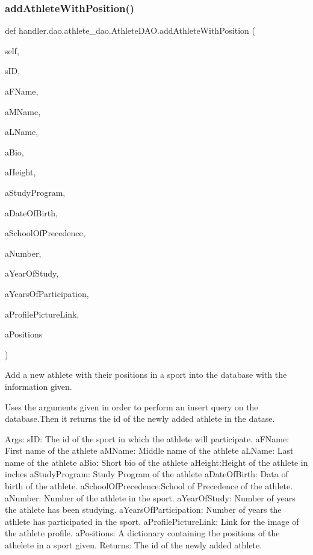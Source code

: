 \subsubsection{\texorpdfstring{add\+Athlete\+With\+Position()}{addAthleteWithPosition()}}
{\footnotesize\ttfamily def handler.\+dao.\+athlete\+\_\+dao.\+Athlete\+D\+A\+O.\+add\+Athlete\+With\+Position (\begin{DoxyParamCaption}\item[{}]{self,  }\item[{}]{s\+ID,  }\item[{}]{a\+F\+Name,  }\item[{}]{a\+M\+Name,  }\item[{}]{a\+L\+Name,  }\item[{}]{a\+Bio,  }\item[{}]{a\+Height,  }\item[{}]{a\+Study\+Program,  }\item[{}]{a\+Date\+Of\+Birth,  }\item[{}]{a\+School\+Of\+Precedence,  }\item[{}]{a\+Number,  }\item[{}]{a\+Year\+Of\+Study,  }\item[{}]{a\+Years\+Of\+Participation,  }\item[{}]{a\+Profile\+Picture\+Link,  }\item[{}]{a\+Positions }\end{DoxyParamCaption})}

\begin{DoxyVerb}Add a new athlete with their positions in a sport
into the database with the information given.

Uses the arguments given in order to perform an insert query on 
the database.Then it returns the id of the newly added athlete in
the datase.

Args:
    sID: The id of the sport in which the athlete will participate.
    aFName: First name of the athlete
    aMName: Middle name of the athlete
    aLName: Last name of the athlete
    aBio: Short bio of the athlete
    aHeight:Height of the athlete in inches
    aStudyProgram: Study Program of the athlete
    aDateOfBirth: Data of birth of the athlete.
    aSchoolOfPrecedence:School of Precedence of the athlete.
    aNumber: Number of the athlete in the sport.
    aYearOfStudy: Number of years the athlete has been studying.
    aYearsOfParticipation: Number of years the athlete has participated in the sport.
    aProfilePictureLink: Link for the image of the athlete profile.
    aPositions: A dictionary containing the positions of the athelete in 
        a sport given.
Returns:
    The id of the newly added athlete.
\end{DoxyVerb}
 \mbox{\label{classhandler_1_1dao_1_1athlete__dao_1_1_athlete_d_a_o_ace87d62a49dc3b03b88d6ff8cf6b0210}} 
